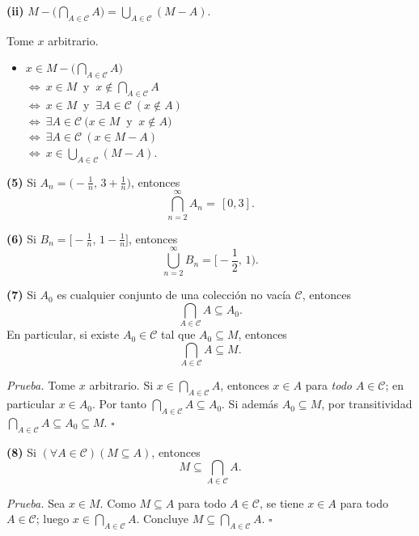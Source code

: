 \documentclass[12pt,letterpaper]{exam}
\begin{document}
\begin{questions}
\textbf{(ii)} \quad $
M - \Big( \displaystyle\bigcap_{A\in\mathcal C} A \Big)
= \displaystyle\bigcup_{A\in\mathcal C} (M - A).
$
\medskip

Tome $x$ arbitrario.
\begin{itemize}
  \item $x \in M - \Big(\displaystyle\bigcap_{A\in\mathcal C} A\Big)$\\[2pt]
  $\Leftrightarrow\ x \in M \ \text{ y }\ x \notin \displaystyle\bigcap_{A\in\mathcal C} A$\\[2pt]
  $\Leftrightarrow\ x \in M \ \text{ y }\ \exists A \in \mathcal C \ (x \notin A)$\\[2pt]
  $\Leftrightarrow\ \exists A \in \mathcal C \ \big(x \in M \ \text{ y }\ x \notin A\big)$\\[2pt]
  $\Leftrightarrow\ \exists A \in \mathcal C \ (x \in M - A)$\\[2pt]
  $\Leftrightarrow\ x \in \displaystyle\bigcup_{A\in\mathcal C} (M - A)$.
\end{itemize}

\question \textbf{(5)} Si $A_n=\Big(-\frac1n,\,3+\frac1n\Big)$, entonces
\[
\bigcap_{n=2}^{\infty}A_n=\,[0,3].
\]

\question \textbf{(6)} Si $B_n=\Big[-\frac1n,\,1-\frac1n\Big]$, entonces
\[
\bigcup_{n=2}^{\infty}B_n=\Big[-\frac12,\,1\Big).
\]

\question \textbf{(7)} Si $A_0$ es cualquier conjunto de una colección no vacía $\mathcal C$, entonces 
\[
\bigcap_{A\in\mathcal C} A \subseteq A_0.
\]
En particular, si existe $A_0\in\mathcal C$ tal que $A_0\subseteq M$, entonces 
\[
\bigcap_{A\in\mathcal C} A \subseteq M.
\]

\textit{Prueba.} Tome $x$ arbitrario. Si $x\in\bigcap_{A\in\mathcal C}A$, entonces $x\in A$ para \emph{todo} $A\in\mathcal C$; en particular $x\in A_0$. Por tanto $\bigcap_{A\in\mathcal C}A\subseteq A_0$. Si además $A_0\subseteq M$, por transitividad
\(
\bigcap_{A\in\mathcal C}A\subseteq A_0\subseteq M.
\)
\hfill$\square$

\question \textbf{(8)} Si $(\forall A\in\mathcal C)(M\subseteq A)$, entonces 
\[
M\subseteq \bigcap_{A\in\mathcal C}A.
\]

\textit{Prueba.} Sea $x\in M$. Como $M\subseteq A$ para todo $A\in\mathcal C$, se tiene $x\in A$ para todo $A\in\mathcal C$; luego $x\in\bigcap_{A\in\mathcal C}A$. Concluye $M\subseteq\bigcap_{A\in\mathcal C}A$.
\hfill$\square$


\end{questions}
\end{document}
